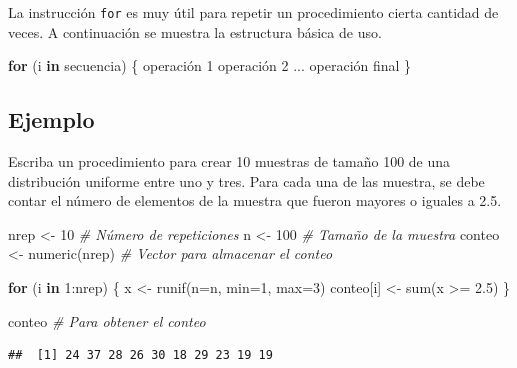 \documentclass[
]{book}
\makeatletter
\newenvironment{Shaded}{\begin{snugshade}}{\end{snugshade}}
\newcommand{\AttributeTok}[1]{\textcolor[rgb]{0.77,0.63,0.00}{#1}}
\newcommand{\CommentTok}[1]{\textcolor[rgb]{0.56,0.35,0.01}{\textit{#1}}}
\newcommand{\ControlFlowTok}[1]{\textcolor[rgb]{0.13,0.29,0.53}{\textbf{#1}}}
\newcommand{\DecValTok}[1]{\textcolor[rgb]{0.00,0.00,0.81}{#1}}
\newcommand{\FloatTok}[1]{\textcolor[rgb]{0.00,0.00,0.81}{#1}}
\newcommand{\FunctionTok}[1]{\textcolor[rgb]{0.00,0.00,0.00}{#1}}
\newcommand{\NormalTok}[1]{#1}
\newcommand{\OtherTok}[1]{\textcolor[rgb]{0.56,0.35,0.01}{#1}}
\newcommand{\SpecialCharTok}[1]{\textcolor[rgb]{0.00,0.00,0.00}{#1}}
\newenvironment{kframe}{%
\medskip{}
\setlength{\fboxsep}{.8em}
 \def\at@end@of@kframe{}%
 \ifinner\ifhmode%
  \def\at@end@of@kframe{\end{minipage}}%
  \begin{minipage}{\columnwidth}%
 \fi\fi%
 \def\FrameCommand##1{\hskip\@totalleftmargin \hskip-\fboxsep
 \colorbox{shadecolor}{##1}\hskip-\fboxsep
     \hskip-\linewidth \hskip-\@totalleftmargin \hskip\columnwidth}%
 \MakeFramed {\advance\hsize-\width
   \@totalleftmargin\z@ \linewidth\hsize
   \@setminipage}}%
 {\par\unskip\endMakeFramed%
 \at@end@of@kframe}
\renewenvironment{Shaded}{\begin{kframe}}{\end{kframe}}
\makeatother
\begin{document}
La instrucción \texttt{for} es muy útil para repetir un procedimiento cierta cantidad de veces. A continuación se muestra la estructura básica de uso.

\begin{Shaded}
\begin{Highlighting}[]
\ControlFlowTok{for}\NormalTok{ (i }\ControlFlowTok{in}\NormalTok{ secuencia) \{}
\NormalTok{  operación }\DecValTok{1}
\NormalTok{  operación }\DecValTok{2}
\NormalTok{  ...}
\NormalTok{  operación final}
\NormalTok{\}}
\end{Highlighting}
\end{Shaded}

\hypertarget{ejemplo-17}{%
\subsection*{Ejemplo}\label{ejemplo-17}}

Escriba un procedimiento para crear 10 muestras de tamaño 100 de una distribución uniforme entre uno y tres. Para cada una de las muestra, se debe contar el número de elementos de la muestra que fueron mayores o iguales a 2.5.

\begin{Shaded}
\begin{Highlighting}[]
\NormalTok{nrep }\OtherTok{\textless{}{-}} \DecValTok{10}  \CommentTok{\# Número de repeticiones}
\NormalTok{n }\OtherTok{\textless{}{-}} \DecValTok{100}    \CommentTok{\# Tamaño de la muestra}
\NormalTok{conteo }\OtherTok{\textless{}{-}} \FunctionTok{numeric}\NormalTok{(nrep)  }\CommentTok{\# Vector para almacenar el conteo}

\ControlFlowTok{for}\NormalTok{ (i }\ControlFlowTok{in} \DecValTok{1}\SpecialCharTok{:}\NormalTok{nrep) \{}
\NormalTok{  x }\OtherTok{\textless{}{-}} \FunctionTok{runif}\NormalTok{(}\AttributeTok{n=}\NormalTok{n, }\AttributeTok{min=}\DecValTok{1}\NormalTok{, }\AttributeTok{max=}\DecValTok{3}\NormalTok{)}
\NormalTok{  conteo[i] }\OtherTok{\textless{}{-}} \FunctionTok{sum}\NormalTok{(x }\SpecialCharTok{\textgreater{}=} \FloatTok{2.5}\NormalTok{)}
\NormalTok{\}}

\NormalTok{conteo  }\CommentTok{\# Para obtener el conteo}
\end{Highlighting}
\end{Shaded}

\begin{verbatim}
##  [1] 24 37 28 26 30 18 29 23 19 19
\end{verbatim}
\end{document}
